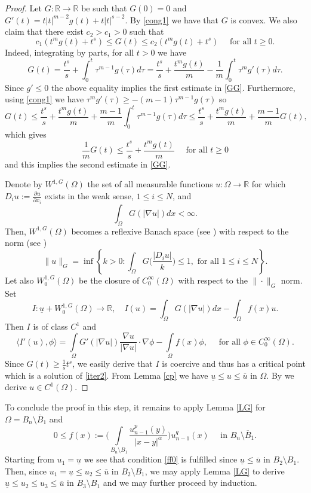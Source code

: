 \documentclass[leqno,12pt]{article}
\numberwithin{equation}{section}
\newcommand{\R}{\mathbb R}
\begin{document}
\begin{proof} Let $G:\R\to \R$ be such that $G(0)=0$ and $G'(t)=t|t|^{m-2}g(t)+t|t|^{s-2}$. By \eqref{cong1} we have that $G$ is convex.  We also claim that there exist $c_2>c_1>0$ such that 
\begin{equation}\label{GG}
c_1(t^m g(t)+t^s)\leq G(t) \leq c_2(t^m g(t)+t^s)\quad\mbox{ for all }t\geq 0.
\end{equation}
Indeed, integrating by parts, for all $t>0$ we have 
$$
G(t)=\frac{t^s}{s}+\int_0^t \tau^{m-1}g(\tau) d\tau=\frac{t^s}{s}+\frac{t^mg(t)}{m}-\frac{1}{m}\int_0^t \tau^{m}g'(\tau) d\tau.
$$
Since $g'\leq 0$ the above equality implies the first estimate in \eqref{GG}. 
Furthermore, using \eqref{cong1} we have $\tau^{m}g'(\tau)\geq -(m-1)\tau^{m-1}g(\tau)$ so
$$
G(t)\leq \frac{t^s}{s}+\frac{t^mg(t)}{m}+\frac{m-1}{m}\int_0^t \tau^{m-1}g(\tau) d\tau\leq \frac{t^s}{s}+\frac{t^mg(t)}{m}+\frac{m-1}{m}G(t),
$$
which gives
$$
\frac{1}{m}G(t)\leq \frac{t^s}{s}+\frac{t^mg(t)}{m} \quad\mbox{ for all }t\geq 0
$$
and this implies the second estimate in \eqref{GG}.

Denote by $W^{1, G}(\Omega)$ the set of all measurable functions $u:\Omega\to \R$ for which $D_{i} u:=\frac{\partial u}{\partial x_i}$ exists in the weak sense, $1\leq i\leq N$, and 
$$
\int_\Omega G(|\nabla u|) dx<\infty.
$$
Then, $W^{1, G}(\Omega)$ becomes a reflexive Banach space (see \cite[Theorem 8.28]{A75}) with respect to the norm (see \cite[Lemma 5.7 ]{G74})
$$
\|u\|_G=\inf\left\{k>0: \int_\Omega G\Big(\frac{|D_{i} u|}{k}\Big)\leq 1, \mbox{ for all } 1\leq i\leq N \right\}.
$$
Let also $W_0^{1, G}(\Omega)$ be the closure of $C_0^\infty(\Omega)$ with respect to the $\|\cdot \|_G$ norm. Set
$$
I:\underline u+W_0^{1, G}(\Omega)\to \R, \quad I(u)=\int_\Omega G(|\nabla u|)dx-\int_\Omega f(x) u.
$$
Then $I$ is of class $C^1$ and 
$$
\langle I'(u), \phi \rangle=\int\limits_\Omega G'(|\nabla u|)\frac{\nabla u}{|\nabla u|}\cdot\nabla \phi-\int\limits_\Omega f(x) \phi,\quad\mbox{ for all }\phi\in C_0^\infty(\Omega).
$$
Since $G(t)\geq \frac{1}{s}t^s$, we easily derive that $I$ is coercive and thus has a critical point which is a solution of \eqref{iter2}. From Lemma \ref{cp} we have $\underline u\leq u\leq \overline u$ in $\Omega$. By \cite[Theorem 1.7]{L91} we derive $u\in C^1(\Omega)$. 
\end{proof}
To conclude the proof in this step, it remains to apply  Lemma \ref{LG} for $\Omega=B_n\setminus \overline B_1$ and 
$$
0\leq f(x):=\Big(\int\limits_{B_n\setminus B_1}\frac{u_{n-1}^p(y)}{|x-y|^\alpha}\Big)u_{n-1}^q(x) \quad\mbox{ in }B_n\setminus \overline B_1.
$$
Starting from $u_1=\underline u$ we see that condition \eqref{ff0} is fulfilled since $\underline u\leq \overline u$ in $B_2\setminus B_1$. Then, since  $u_1=\underline u\leq u_2\leq \overline u$ in $B_2\setminus B_1$, we may  apply Lemma \ref{LG} to derive 
$\underline u\leq u_2\leq u_3\leq \overline u$ in $B_3\setminus B_1$ and we may further proceed by induction. 
\smallskip
\end{document}
